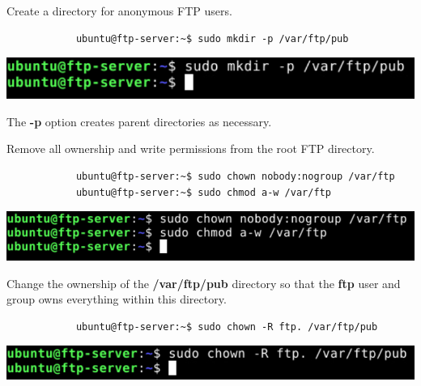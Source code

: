 \documentclass[letterpaper, 12pt]{article}
\begin{document}
\begin{enumerate}
    \begin{labstep}
        Create a directory for anonymous FTP users.
        \begin{lstlisting}
            ubuntu@ftp-server:~$ sudo mkdir -p /var/ftp/pub
        \end{lstlisting}

        \begin{center}
            \includegraphics[width=\linewidth]{images/part2/step11.png}
        \end{center}
    \end{labstep}

    \begin{notebox}
        The \textbf{-p} option creates parent directories as necessary.
    \end{notebox}

    \begin{labstep}
        Remove all ownership and write permissions from the root FTP directory.
        \begin{lstlisting}
            ubuntu@ftp-server:~$ sudo chown nobody:nogroup /var/ftp
            ubuntu@ftp-server:~$ sudo chmod a-w /var/ftp
        \end{lstlisting}

        \begin{center}
            \includegraphics[width=\linewidth]{images/part2/step12.png}
        \end{center}
    \end{labstep}

    \begin{labstep}
        Change the ownership of the \textbf{/var/ftp/pub} directory so that the \textbf{ftp} user and group owns everything within this directory.
        \begin{lstlisting}
            ubuntu@ftp-server:~$ sudo chown -R ftp. /var/ftp/pub
        \end{lstlisting}

        \begin{center}
            \includegraphics[width=\linewidth]{images/part2/step13.png}
        \end{center}
    \end{labstep}


\end{enumerate}
\end{document}
